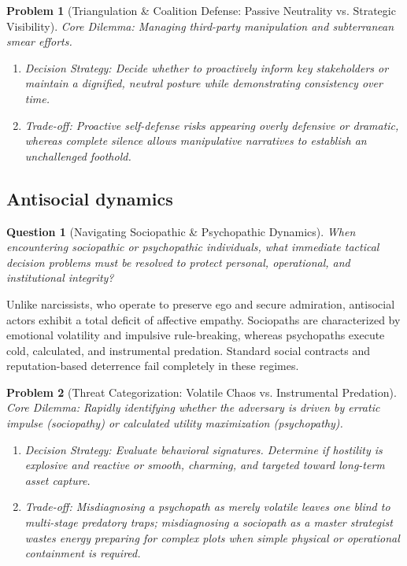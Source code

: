 \documentclass{article}
\newtheorem{problem}{Problem}
\newtheorem{question}{Question}
\begin{document}
\begin{problem}[Triangulation \& Coalition Defense: Passive Neutrality vs. Strategic Visibility]
	\emph{Core Dilemma:} Managing third-party manipulation and subterranean smear efforts.
	\begin{enumerate}[label=(\roman*)]
		\item \emph{Decision Strategy:} Decide whether to proactively inform key stakeholders or maintain a dignified, neutral posture while demonstrating consistency over time.
		\item \emph{Trade-off:} Proactive self-defense risks appearing overly defensive or dramatic, whereas complete silence allows manipulative narratives to establish an unchallenged foothold.
	\end{enumerate}
\end{problem}

\subsection{Antisocial dynamics}

\begin{question}[Navigating Sociopathic \& Psychopathic Dynamics]
	When encountering sociopathic or psychopathic individuals, what immediate tactical decision problems must be resolved to protect personal, operational, and institutional integrity?
\end{question}

Unlike narcissists, who operate to preserve ego and secure admiration, antisocial actors exhibit a total deficit of affective empathy. Sociopaths are characterized by emotional volatility and impulsive rule-breaking, whereas psychopaths execute cold, calculated, and instrumental predation. Standard social contracts and reputation-based deterrence fail completely in these regimes.

\begin{problem}[Threat Categorization: Volatile Chaos vs. Instrumental Predation]
	\emph{Core Dilemma:} Rapidly identifying whether the adversary is driven by erratic impulse (sociopathy) or calculated utility maximization (psychopathy).
	\begin{enumerate}[label=(\roman*)]
		\item \emph{Decision Strategy:} Evaluate behavioral signatures. Determine if hostility is explosive and reactive or smooth, charming, and targeted toward long-term asset capture.
		\item \emph{Trade-off:} Misdiagnosing a psychopath as merely volatile leaves one blind to multi-stage predatory traps; misdiagnosing a sociopath as a master strategist wastes energy preparing for complex plots when simple physical or operational containment is required.
	\end{enumerate}
\end{problem}
\end{document}
